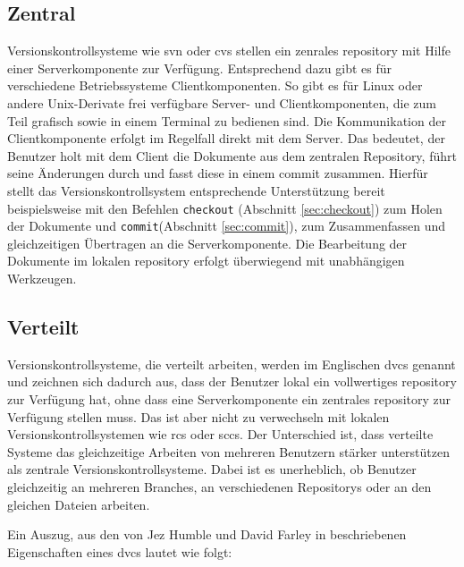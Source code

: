 \subsection{Zentral}\label{sec:central}
Versionskontrollsysteme wie \acrshort{svn} oder \acrshort{cvs} stellen ein
zenrales \gls{repository} mit Hilfe einer Serverkomponente zur Verfügung.
Entsprechend dazu gibt es für verschiedene Betriebssysteme Clientkomponenten.
So gibt es für Linux oder andere Unix-Derivate frei verfügbare Server- und
Clientkomponenten, die zum Teil grafisch sowie in einem Terminal zu bedienen
sind. Die Kommunikation der Clientkomponente erfolgt im Regelfall direkt mit
dem Server. Das bedeutet, der Benutzer holt mit dem Client die Dokumente aus
dem zentralen Repository, führt seine Änderungen durch und fasst diese in einem
\gls{commit} zusammen. Hierfür stellt das Versionskontrollsystem entsprechende
Unterstützung bereit beispielsweise mit den Befehlen \texttt{checkout}
(Abschnitt \ref{sec:checkout}) zum Holen der Dokumente und
\texttt{commit}(Abschnitt \ref{sec:commit}), zum Zusammenfassen und
gleichzeitigen Übertragen an die Serverkomponente. Die Bearbeitung der
Dokumente im lokalen \gls{repository} erfolgt überwiegend mit unabhängigen
Werkzeugen. \cite[S.~38-40]{hagen:1678}

\subsection{Verteilt}\label{sec:decentral}
Versionskontrollsysteme, die verteilt arbeiten, werden im Englischen
\acrfull{dvcs} genannt und zeichnen sich dadurch aus, dass der Benutzer lokal
ein vollwertiges \gls{repository} zur Verfügung hat, ohne dass eine
Serverkomponente ein zentrales \gls{repository} zur Verfügung stellen muss. Das
ist aber nicht zu verwechseln mit lokalen Versionskontrollsystemen wie
\acrshort{rcs} oder \acrshort{sccs}. Der Unterschied ist, dass verteilte
Systeme das gleichzeitige Arbeiten von mehreren Benutzern stärker unterstützen als
zentrale Versionskontrollsysteme. Dabei ist es unerheblich, ob Benutzer gleichzeitig
an mehreren Branches, an verschiedenen Repositorys oder an den gleichen
Dateien arbeiten. \cite[S.~393-394]{cd}

Ein Auszug, aus den von Jez Humble und David Farley in \cite[S.~393-394]{cd}
beschriebenen Eigenschaften eines \acrshort{dvcs} lautet wie folgt:

